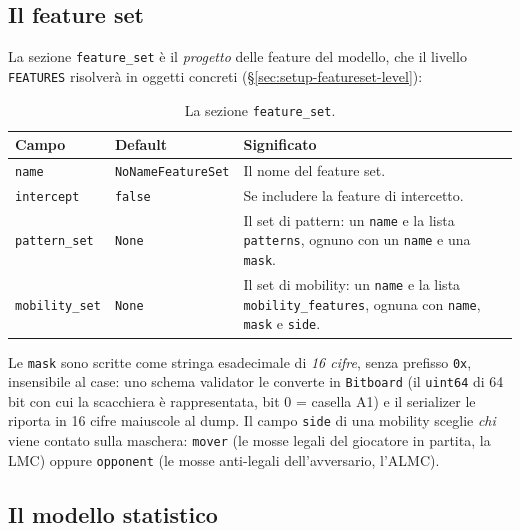 \subsection{Il feature set}

La sezione \texttt{feature\_set} è il \emph{progetto} delle feature del
modello, che il livello \texttt{FEATURES} risolverà in oggetti concreti
(§\ref{sec:setup-featureset-level}):

\begin{table}[htbp]
\centering
\small
\begin{tabularx}{\textwidth}{@{}llX@{}}
\toprule
Campo & Default & Significato \\
\midrule
\texttt{name}        & \texttt{NoNameFeatureSet} & Il nome del feature set. \\
\texttt{intercept}   & \texttt{false} & Se includere la feature di intercetto. \\
\texttt{pattern\_set} & \texttt{None} & Il set di pattern: un \texttt{name} e la lista \texttt{patterns}, ognuno con un \texttt{name} e una \texttt{mask}. \\
\texttt{mobility\_set} & \texttt{None} & Il set di mobility: un \texttt{name} e la lista \texttt{mobility\_features}, ognuna con \texttt{name}, \texttt{mask} e \texttt{side}. \\
\bottomrule
\end{tabularx}
\caption{La sezione \texttt{feature\_set}.}
\label{tab:setup-featureset}
\end{table}

Le \texttt{mask} sono scritte come stringa esadecimale di \emph{16 cifre},
senza prefisso \texttt{0x}, insensibile al case: uno schema validator le
converte in \texttt{Bitboard} (il \texttt{uint64} di 64 bit con cui la
scacchiera è rappresentata, bit 0 = casella A1) e il serializer le riporta
in 16 cifre maiuscole al dump. Il campo \texttt{side} di una mobility
sceglie \emph{chi} viene contato sulla maschera: \texttt{mover} (le mosse
legali del giocatore in partita, la LMC) oppure \texttt{opponent} (le
mosse anti-legali dell'avversario, l'ALMC).

\subsection{Il modello statistico}

